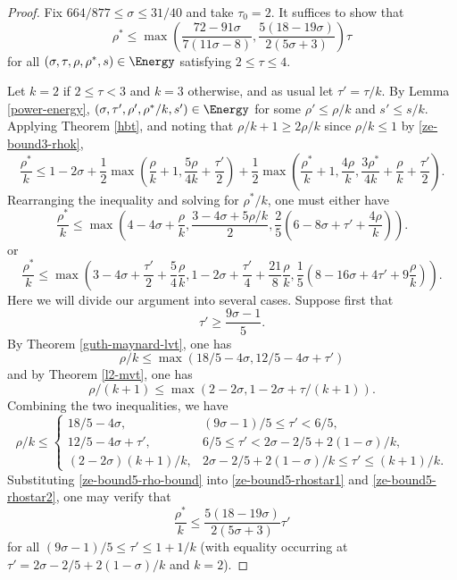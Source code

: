 \begin{proof}
Fix $664/877 \le \sigma \le 31/40$ and take $\tau_0 = 2$. It suffices to show that
\[
\rho^* \le \max\left(\frac{72 - 91\sigma}{7(11\sigma - 8)}, \frac{5(18 - 19\sigma)}{2(5\sigma + 3)}\right)\tau
\]
for all $(\sigma, \tau, \rho, \rho^*, s) \in \Energy$ satisfying $2 \le \tau \le 4$.

Let $k = 2$ if $2 \le \tau < 3$ and $k = 3$ otherwise, and as usual let $\tau' = \tau/k$. By Lemma \ref{power-energy}, $(\sigma, \tau', \rho', \rho^*/k, s') \in \Energy$ for some $\rho' \le \rho/k$ and $s' \le s/k$. Applying Theorem \ref{hbt}, and noting that $\rho/k + 1 \ge 2\rho/k$ since $\rho/k \le 1$ by \eqref{ze-bound3-rhok},
\[
\frac{\rho^*}{k} \le 1-2\sigma + \frac{1}{2}\max(\frac{\rho}{k}+1, \frac{5\rho}{4k} + \frac{\tau'}{2}) + \frac{1}{2}\max(\frac{\rho^*}{k}+1, \frac{4\rho}{k}, \frac{3\rho^*}{4k} +\frac{\rho}{k}+\frac{\tau'}{2}).
\]
Rearranging the inequality and solving for $\rho^*/k$, one must either have
\begin{equation}\label{ze-bound5-rhostar1}
\frac{\rho^*}{k} \le \max(4 - 4\sigma + \frac{\rho}{k}, \frac{3 - 4\sigma + 5\rho/k}{2}, \frac{2}{5}(6 - 8\sigma + \tau' + \frac{4\rho}{k})).
\end{equation}
or
\begin{equation}\label{ze-bound5-rhostar2}
\frac{\rho^*}{k} \le \max(3 - 4\sigma + \frac{\tau'}{2} + \frac{5}{4}\frac{\rho}{k}, 1 - 2\sigma + \frac{\tau'}{4} + \frac{21}{8}\frac{\rho}{k}, \frac{1}{5}(8 - 16\sigma + 4\tau' + 9\frac{\rho}{k})).
\end{equation}
Here we will divide our argument into several cases. Suppose first that
\[
\tau' \ge \frac{9\sigma - 1}{5}.
\]
By Theorem \ref{guth-maynard-lvt}, one has
\[
\rho/k \le \max(18/5 - 4\sigma, 12/5 - 4\sigma + \tau')
\]
and by Theorem \ref{l2-mvt}, one has
\[
\rho/(k + 1) \le \max(2 - 2\sigma, 1 - 2\sigma + \tau/(k + 1)).
\]
Combining the two inequalities, we have
\begin{equation}\label{ze-bound5-rho-bound}
\rho/k \le \begin{cases}
18/5 - 4\sigma,& (9\sigma - 1)/5 \le \tau' < 6/5,\\
12/5 - 4\sigma + \tau',& 6/5 \le \tau' < 2\sigma - 2/5 + 2(1 - \sigma)/k,\\
(2 - 2\sigma)(k + 1)/k,& 2\sigma - 2/5 + 2(1 - \sigma)/k \le \tau' \le (k + 1)/k.
\end{cases}
\end{equation}
Substituting \eqref{ze-bound5-rho-bound} into \eqref{ze-bound5-rhostar1} and \eqref{ze-bound5-rhostar2}, one may verify that
\[
\frac{\rho^*}{k} \le \frac{5(18 - 19\sigma)}{2(5\sigma + 3)}\tau'
\]
for all $(9\sigma - 1)/5 \le \tau' \le 1 + 1/k$ (with equality occurring at $\tau' = 2\sigma - 2/5 + 2(1 - \sigma)/k$ and $k = 2$).


\end{proof}

